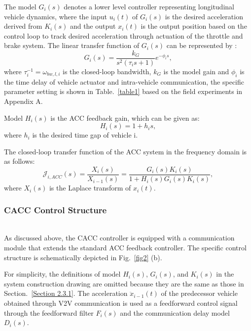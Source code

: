 \documentclass[journal]{IEEEtran}
\begin{document}
The model $G_i (s)$ denotes a lower level controller representing longitudinal vehicle dynamics, where the input $u_i (t)$ of $G_i (s)$ is the desired acceleration derived from $K_i (s)$ and the output $x_i (t)$ is the output position based on the control loop to track desired acceleration through actuation of the throttle and brake system. The linear transfer function of $G_i (s)$ can be represented by \citep{ploeg2013lp}:
\begin{equation}
  G_{i}(s)=\frac{k_{G}}{s^{2}\left(\tau_{i} s+1\right)} e^{-\phi_{i} s},
\end{equation}
where $\tau_{i}^{-1}=\omega_{b w, l, i}$ is the closed-loop bandwidth, $k_G$ is the model gain and $\phi_{i}$ is the time delay of vehicle actuator and intra-vehicle
communication, the specific parameter setting is shown in Table.~\ref{table1} based on the field experiments in Appendix A.

Model $H_i (s)$ is the ACC feedback gain, which can be given as:
\begin{equation}
  H_{i}(s)=1+h_{i} s,
\end{equation}
where $h_i$ is the desired time gap of vehicle i.

The closed-loop transfer function of the ACC system in the frequency domain is as follows:
\begin{equation}
  \mathcal{J}_{i, A C C}(s)=\frac{X_{i}(s)}{X_{i-1}(s)}=\frac{G_{i}(s) K_{i}(s)}{1+H_{i}(s) G_{i}(s) K_{i}(s)},
\end{equation}
where $X_i (s)$ is the Laplace transform of $x_i (t)$.

\subsubsection{CACC Control Structure}
\label{Section 2.3.2}
~\\

As discussed above, the CACC controller is equipped with a communication module that extends the standard ACC feedback controller. The specific control structure is schematically depicted in Fig.~\ref{fig2} (b).

For simplicity, the definitions of model $H_i(s)$, $G_i(s)$, and $K_i(s)$ in the system construction drawing are omitted because they are the same as those in Section.~\ref{Section 2.3.1}. The acceleration $\ddot{x}_{i-1}(t)$ of the predecessor vehicle obtained through V2V communication is used as a feedforward control signal through the feedforward filter $F_i(s)$ and the communication delay model $D_i(s)$.
\end{document}
